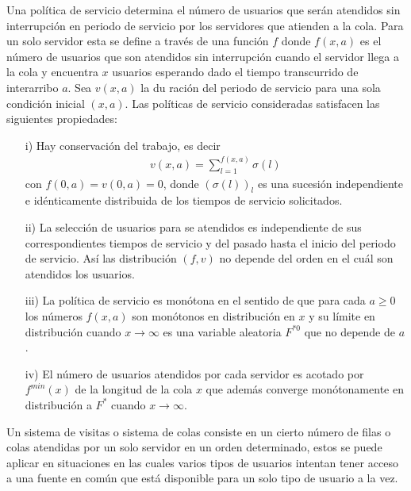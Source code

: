 \documentclass{article}
\numberwithin{equation}{section}
\begin{document}
Una pol\'itica de servicio determina el n\'umero de usuarios que ser\'an atendidos sin interrupci\'on en periodo de servicio por los servidores que atienden a la cola. Para un solo servidor esta se define a trav\'es de una funci\'on $f$ donde $f\left(x,a\right)$ es el n\'umero de usuarios que son atendidos sin interrupci\'on cuando el servidor llega a la cola y encuentra $x$ usuarios esperando dado el tiempo transcurrido de interarribo $a$. Sea $v\left(x,a\right)$ la du raci\'on del periodo de servicio para una sola condici\'on inicial $\left(x,a\right)$. Las pol\'iticas de servicio consideradas satisfacen las siguientes propiedades:

\begin{itemize}
\item[i)] Hay conservaci\'on del trabajo, es decir
\begin{eqnarray}
v\left(x,a\right)=\sum_{l=1}^{f\left(x,a\right)}\sigma\left(l\right)
\end{eqnarray}
con $f\left(0,a\right)=v\left(0,a\right)=0$, donde $\left(\sigma\left(l\right)\right)_{l}$ es una sucesi\'on independiente e id\'enticamente distribuida de los tiempos de servicio solicitados. 
\item[ii)] La selecci\'on de usuarios para se atendidos es independiente de sus correspondientes tiempos de servicio y del pasado hasta el inicio del periodo de servicio. As\'i las distribuci\'on $\left(f,v\right)$ no depende del orden en el cu\'al son atendidos los usuarios. \item[iii)] La pol\'itica de servicio es mon\'otona en el sentido de que para cada $a\geq0$ los n\'umeros $f\left(x,a\right)$ son mon\'otonos en distribuci\'on en $x$ y su l\'imite en distribuci\'on cuando $x\rightarrow\infty$ es una variable aleatoria $F^{*0}$ que no depende de $a$. \item[iv)] El n\'umero de usuarios atendidos por cada servidor es acotado por $f^{min}\left(x\right)$ de la longitud de la cola $x$ que adem\'as converge mon\'otonamente en distribuci\'on a $F^{*}$ cuando $x\rightarrow\infty$.
\end{itemize}


Un sistema de visitas o sistema de colas consiste en un cierto n\'umero de filas o colas atendidas por un solo servidor en un orden determinado, estos se puede aplicar en situaciones en las cuales varios tipos de usuarios intentan tener acceso a una fuente en com\'un que est\'a disponible para un solo tipo de usuario a la vez. 
\end{document}
